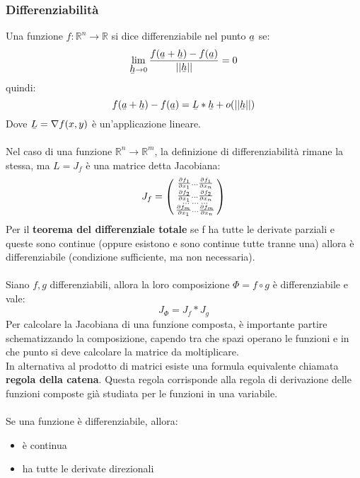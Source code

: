 \documentclass{article}
\newcommand\ubar[1]{\stackunder[1.2pt]{$#1$}{\rule{.8ex}{.075ex}}}
\newcommand{\R}{\mathds{R}}
\begin{document}
\subsubsection{Differenziabilità}
Una funzione $f:\R^n\rightarrow\R$ si dice differenziabile nel punto $\ubar{a}$ se:
$$ \lim_{\ubar{h}\rightarrow0}\frac{f(\ubar{a}+\ubar{h})-f(\ubar{a})}{||\ubar{h}||}=0 $$
quindi:
$$ f(\ubar{a}+\ubar{h})-f(\ubar{a})=\ubar{L}*\ubar{h}+o(||\ubar{h}||) $$
Dove $\ubar{L}=\nabla f(x,y)$ è un'applicazione lineare.\\\\
Nel caso di una funzione $\R^n\rightarrow\R^m$, la definizione di differenziabilità rimane la stessa, ma $L=J_f$ è una matrice detta Jacobiana:
$$J_f=\begin{psmallmatrix}\frac{\partial f_1}{\partial x_1} ... \frac{\partial f_1}{\partial x_n}\\ \frac{\partial f_2}{\partial x_1} ... \frac{\partial f_2}{\partial x_n} \\ ...\;...\;... \\ \frac{\partial f_m}{\partial x_1} ... \frac{\partial f_m}{\partial x_n} \end{psmallmatrix}$$
Per il \textbf{teorema del differenziale totale} se f ha tutte le derivate parziali e queste sono continue (oppure esistono e sono continue tutte tranne una) allora è differenziabile (condizione sufficiente, ma non necessaria).\\\\
Siano $f,g$ differenziabili, allora la loro composizione $\Phi=f\circ g$ è differenziabile e vale:
$$J_\Phi=J_f*J_g $$
Per calcolare la Jacobiana di una funzione composta, è importante partire schematizzando la composizione, capendo tra che spazi operano le funzioni e in che punto si deve calcolare la matrice da moltiplicare.\\
In alternativa al prodotto di matrici esiste una formula equivalente chiamata \textbf{regola della catena}. Questa regola corrisponde alla regola di derivazione delle funzioni composte già studiata per le funzioni in una variabile.\\\\
Se una funzione è differenziabile, allora:
\begin{itemize}
    \item è continua
    \item ha tutte le derivate direzionali
\end{itemize}
\end{document}

